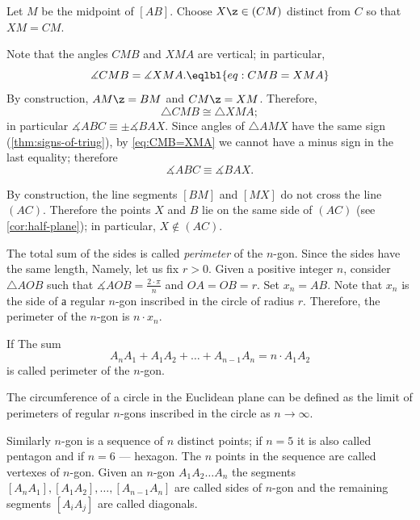 Let $M$ be the midpoint of $[AB]$.
Choose $X\z\in (CM)$ distinct from $C$ so that $XM=CM$.


Note that the angles $CMB$ and $XMA$
are vertical;
in particular, 
$$\measuredangle CMB=\measuredangle XMA.\eqlbl{eq:CMB=XMA}$$
By construction, $AM\z=BM$ and $CM\z=XM$.
Therefore, 
$$\triangle CMB\cong \triangle XMA;$$ 
in particular $\measuredangle ABC\equiv\pm \measuredangle BAX$.
Since angles of $\triangle A M X$ have the same sign (\ref{thm:signs-of-triug}),
by \ref{eq:CMB=XMA} we cannot have a minus sign in the last equality; therefore
$$\measuredangle ABC\equiv\measuredangle BAX.$$

By construction, the line segments $[BM]$ and $[MX]$ do not cross the line $(AC)$.
Therefore the points $X$ and $B$ lie on the same side of $(AC)$ (see \ref{cor:half-plane});
in particular, $X\notin (AC)$.
\qeds

















The total sum of the sides is called \emph{perimeter} of the $n$-gon.
Since the sides have the same length, 
Namely, let us fix $r>0$.
Given a positive integer $n$, consider $\triangle AOB$
such that
$\measuredangle AOB=\tfrac{2\cdot\pi}{n}$ and $OA=OB=r$.
Set $x_n=AB$.
Note that $x_n$ is the side of а regular $n$-gon inscribed in the circle of radius $r$. %
Therefore, the perimeter of the $n$-gon is $n\cdot x_n$.


If 
The sum
\[A_nA_1+A_1A_2+\dots+A_{n-1}A_n=n\cdot A_1A_2\]
is called perimeter of the $n$-gon.

The circumference of a circle in the Euclidean plane
can be defined as the limit of perimeters of regular $n$-gons inscribed in the circle as $n\to \infty$.
















Similarly $n$-gon is a sequence of $n$ distinct points;
if $n=5$ it is also called pentagon
and if $n=6$ --- hexagon.
The $n$ points in the sequence are called vertexes of $n$-gon.
Given an $n$-gon $A_1A_2\dots A_n$ the segments $[A_nA_1], [A_1A_2], \dots, [A_{n-1}A_n]$ are called sides of $n$-gon and the remaining segments $[A_iA_j]$ are called diagonals.















